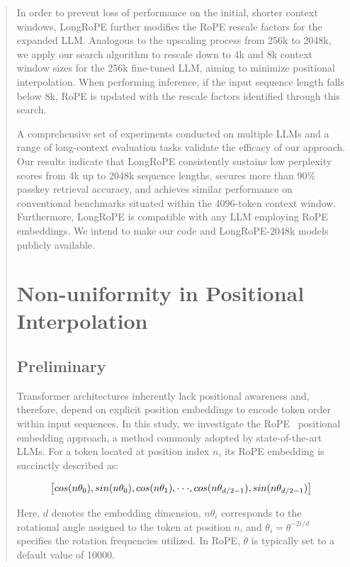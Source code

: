 \begin{abstract}
In order to prevent loss of performance on the initial, shorter context windows, {LongRoPE} further modifies the RoPE rescale factors for the expanded LLM. Analogous to the upscaling process from 256k to 2048k, we apply our search algorithm to rescale down to 4k and 8k context window sizes for the 256k fine-tuned LLM, aiming to minimize positional interpolation. When performing inference, if the input sequence length falls below 8k, RoPE is updated with the rescale factors identified through this search.

A comprehensive set of experiments conducted on multiple LLMs and a range of long-context evaluation tasks validate the efficacy of our approach. Our results indicate that LongRoPE consistently sustains low perplexity scores from 4k up to 2048k sequence lengths, secures more than 90\% passkey retrieval accuracy, and achieves similar performance on conventional benchmarks situated within the 4096-token context window. Furthermore, LongRoPE is compatible with any LLM employing RoPE embeddings. We intend to make our code and LongRoPE-2048k models publicly available.

\section{Non-uniformity in Positional Interpolation}
\label{sec:analysis}

\subsection{Preliminary}

Transformer architectures inherently lack positional awareness and, therefore, depend on explicit position embeddings to encode token order within input sequences. In this study, we investigate the RoPE~\cite{rope} positional embedding approach, a method commonly adopted by state-of-the-art LLMs. For a token located at position index $n$, its RoPE embedding is succinctly described as:

\begin{equation}
		\fontsize{7.8}{7.8} \selectfont
	\label{eq:rope}
	\left[ cos(n\theta_0), sin(n\theta_0), cos(n\theta_1), \cdot\cdot\cdot, cos(n\theta_{d/2-1}), sin(n\theta_{d/2-1}) \right]   
\end{equation}

Here, $d$ denotes the embedding dimension, 
 $n\theta_i$ corresponds to the rotational angle assigned to the token at position $n$, and
$\theta_i = \theta^{-2i/d}$ specifies the rotation frequencies utilized. In RoPE, $\theta$ is typically set to a default value of 10000.


\end{abstract}
